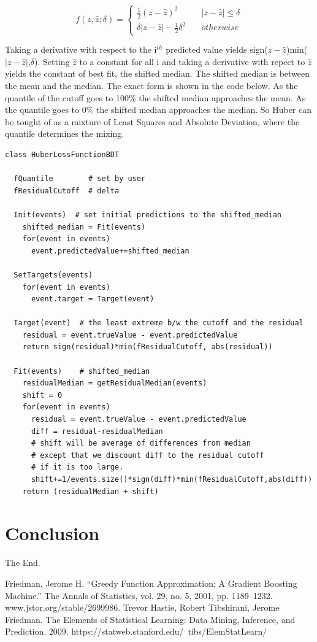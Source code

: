 \documentclass[12pt]{article}
\begin{document}
$$
f(z,\hat{z}; \delta) = \left\{
        \begin{array}{ll}
            \frac{1}{2}(z-\hat{z})^2 & \quad |z-\hat{z}| \leq \delta \\
            \delta|z-\hat{z}| - \frac{1}{2}\delta^2 & \quad otherwise
        \end{array}
    \right.
$$

Taking a derivative with respect to the i$^{th}$ predicted value yields sign($z-\hat{z}$)min($|z-\hat{z}|$,$\delta$). Setting $\hat{z}$ to a constant for all i and taking a derivative with repect to $\hat{z}$ yields the constant of best fit, the shifted median. The shifted median is between the mean and the median. The exact form is shown in the code below. As the quantile of the cutoff goes to 100\% the shifted median approaches the mean. As the quantile goes to 0\% the shifted median approaches the median. So Huber can be tought of as a mixture of Least Squares and Absolute Deviation, where the quantile determines the mixing. 

\begin{verbatim}
class HuberLossFunctionBDT

  fQuantile        # set by user
  fResidualCutoff  # delta

  Init(events)  # set initial predictions to the shifted_median
    shifted_median = Fit(events)
    for(event in events)
      event.predictedValue+=shifted_median

  SetTargets(events)  
    for(event in events)  
      event.target = Target(event)

  Target(event)  # the least extreme b/w the cutoff and the residual 
    residual = event.trueValue - event.predictedValue
    return sign(residual)*min(fResidualCutoff, abs(residual))

  Fit(events)    # shifted_median                
    residualMedian = getResidualMedian(events)
    shift = 0
    for(event in events)
      residual = event.trueValue - event.predictedValue
      diff = residual-residualMedian
      # shift will be average of differences from median
      # except that we discount diff to the residual cutoff
      # if it is too large.
      shift+=1/events.size()*sign(diff)*min(fResidualCutoff,abs(diff))
    return (residualMedian + shift)

\end{verbatim}

\section{Conclusion}

The End.

\begin{thebibliography}{9}
Friedman, Jerome H. “Greedy Function Approximation: A Gradient Boosting Machine.” The Annals of Statistics, vol. 29, no. 5, 2001, pp. 1189–1232. www.jstor.org/stable/2699986.
Trevor Hastie, Robert Tibshirani, Jerome Friedman. The Elements of Statistical Learning: Data Mining, Inference, and Prediction. 2009. https://statweb.stanford.edu/~tibs/ElemStatLearn/ 
\end{thebibliography}
\end{document}
